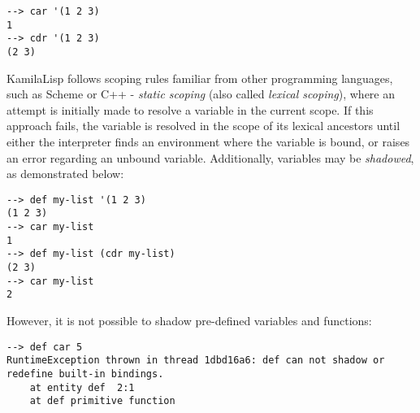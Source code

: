 \begin{verbatim}
--> car '(1 2 3)
1
--> cdr '(1 2 3)
(2 3)
\end{verbatim}

KamilaLisp follows scoping rules familiar from other programming languages, such as Scheme or C++ - \textit{static scoping} (also called \textit{lexical scoping}), where an attempt is initially made to resolve a variable in the current scope. If this approach fails, the variable is resolved in the scope of its lexical ancestors until either the interpreter finds an environment where the variable is bound, or raises an error regarding an unbound variable. Additionally, variables may be \textit{shadowed}, as demonstrated below:

\begin{verbatim}
--> def my-list '(1 2 3)
(1 2 3)
--> car my-list
1
--> def my-list (cdr my-list)
(2 3)
--> car my-list
2
\end{verbatim}

However, it is not possible to shadow pre-defined variables and functions:

\begin{verbatim}
--> def car 5
RuntimeException thrown in thread 1dbd16a6: def can not shadow or redefine built-in bindings.
    at entity def  2:1
    at def primitive function
\end{verbatim}
